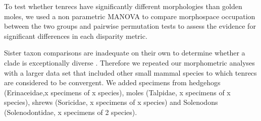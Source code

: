 \documentclass[12pt,a4paper]{article}
\begin{document}
To test whether tenrecs have significantly different morphologies than golden moles, we used a non parametric MANOVA \citep{Anderson2001} to compare morphospace occupation between the two groups and pairwise permutation tests to assess the evidence for significant differences in each disparity metric.

Sister taxon comparisons are inadequate on their own to determine whether a clade is exceptionally diverse \citep{Losos2002}. Therefore we repeated our morphometric analyses with a larger data set that included other small mammal species to which tenrecs are considered to be convergent. We added specimens from hedgehogs (Erinaceidae,x specimens of x species), moles (Talpidae, x specimens of x species), shrews (Soricidae, x specimens of x species) and Solenodons (Solenodontidae, x specimens of 2 species).







\end{document}
